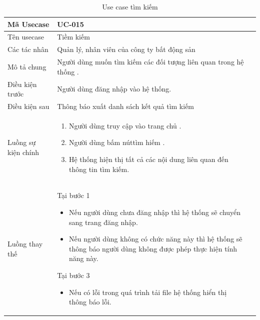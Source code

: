 \documentclass[12pt,a4paper]{article}
\begin{document}
    \begin{table}[H]
        \centering
        \begin{tabular}{|p{3.5cm}|p{11.5cm}|c|}
            \hline
            Mã Usecase      & UC-015                                                            \\
            \hline
            Tên usecase     & Tiềm kiếm                                                         \\
            \hline
            Các tác nhân    & Quản lý, nhân viên của công ty bất động sản                       \\
            \hline
            Mô tả chung     & Người dùng muốn tìm kiếm các đối tượng liên quan trong hệ thống . \\
            \hline

            Điều kiện trước & Người dùng đăng nhập vào hệ thống.                                \\
            \hline

            Điều kiện sau   & Thông báo xuất danh sách kết quả tìm kiếm                         \\
            \hline

            Luồng sự kiện chính & \vspace{-.8cm}\begin{enumerate}
                                                    \item Người dùng truy cập vào trang chủ .
                                                    \item Người dùng bấm núttìm hiếm .
                                                    \item Hệ thống hiện thị tất cả các nội dung liên quan đến thông tin tìm kiếm.
            \end{enumerate}
            \\
            \hline
            Luồng thay thế & Tại bước 1\newline
            \vspace{-.8cm}\begin{itemize}
                              \item Nếu người dùng chưa đăng nhập thì hệ thống sẽ chuyển sang trang đăng nhập.
                              \item Nếu người dùng không có chức năng này thì hệ thống sẽ thông báo người dùng không được phép thực hiện tính năng này.
            \end{itemize}
            Tại bước 3\newline
            \vspace{-.8cm}\begin{itemize}
                              \item Nếu có lỗi trong quá trình tải file hệ thống hiển thị thông báo lỗi.
            \end{itemize}
            \\ \hline
        \end{tabular}
        \caption{Use case tìm kiếm}

    \end{table}
\end{document}
